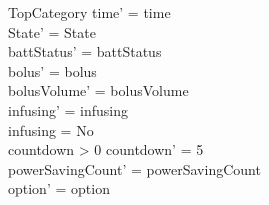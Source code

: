\begin{schema}{TopCategory}
	time' = time\\ State' = State\\
	battStatus' = battStatus\\
	\pagebreak
	bolus' = bolus\\
	bolusVolume' = bolusVolume\\
	infusing' = infusing\\
	infusing = No\\
	countdown > 0 \land countdown' = 5\\
	powerSavingCount' = powerSavingCount\\ option' = option\\
\end{schema}

